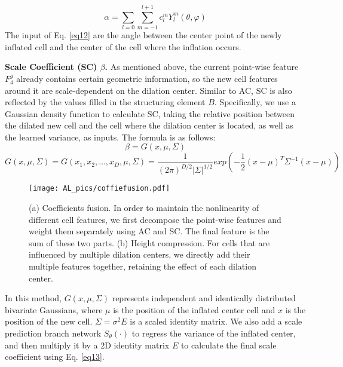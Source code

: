 \begin{equation}
	\label{eq12}
	\alpha=\sum_{l=0} \sum_{m=-1}^{l+1} c_l^m Y^m_l(\theta,\varphi)
\end{equation}
The input of Eq. \ref{eq12} are the angle between the center point of the newly inflated cell and the center of the cell where the inflation occurs.

\textbf{Scale Coefficient (SC) $\beta$.} As mentioned above, the current point-wise feature $F^g_4$ already contains certain geometric information, so the new cell features around it are scale-dependent on the dilation center. Similar to AC, SC is also reflected by the values filled in the structuring element $B$. Specifically, we use a Gaussian density function to calculate SC, taking the relative position between the dilated new cell and the cell where the dilation center is located, as well as the learned variance, as inputs. The formula is as follows:
\begin{equation}
	\label{eq13}
	\beta= G(x,\mu,\Sigma)
\end{equation}
\begin{equation}
	\label{eq14}
	G(x,\mu,\Sigma)=G(x_1,x_2,\dots,x_D,\mu,\Sigma)=\frac{1}{(2\pi)^{D/2}{\vert\Sigma\vert}^{1/2}} exp(-\frac{1}{2}(x-\mu)^T{\Sigma}^{-1}(x-\mu))
\end{equation}

\begin{figure}[t]
	\begin{center}
		\texttt{[image: AL\_pics/coffiefusion.pdf]}
	\end{center}
	\vspace{-0.3cm}
	\caption{(a) Coefficients fusion. In order to maintain the nonlinearity of different cell features, we first decompose the point-wise features and weight them separately using AC and SC. The final feature is the sum of these two parts. (b) Height compression. For cells that are influenced by multiple dilation centers, we directly add their multiple features together, retaining the effect of each dilation center.}
	\label{fig6}
	\vspace{-0.3cm}
\end{figure}

In this method, $G(x, \mu, \Sigma)$ represents independent and identically distributed bivariate Gaussians, where $\mu$ is the position of the inflated center cell and $x$ is the position of the new cell. $\Sigma=\sigma^2E$ is a scaled identity matrix. We also add a scale prediction branch network $S_\theta(\cdot)$ to regress the variance of the inflated center, and then multiply it by a 2D identity matrix $E$ to calculate the final scale coefficient using Eq. \ref{eq13}.

